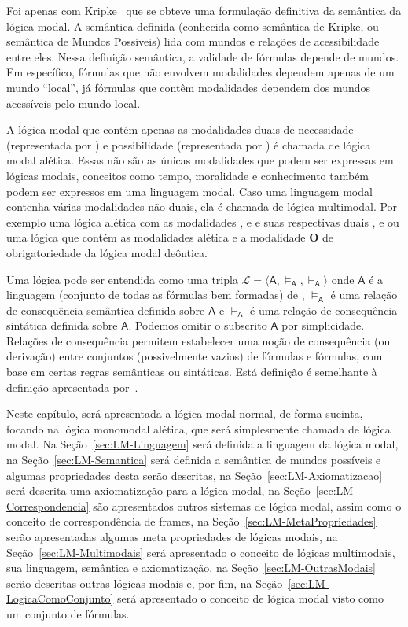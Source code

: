     Foi apenas com Kripke~\cite{kripke1959completeness,kripke1963semantical} que se obteve uma formulação definitiva da semântica da lógica modal.
    A semântica definida (conhecida como semântica de Kripke, ou semântica de Mundos Possíveis) lida com mundos e relações de acessibilidade entre eles.
    Nessa definição semântica, a validade de fórmulas depende de mundos. Em específico, fórmulas que não envolvem modalidades dependem apenas de um
    mundo ``local'', já fórmulas que contêm modalidades dependem dos mundos acessíveis pelo mundo local.

    A lógica modal que contém apenas as modalidades duais de necessidade (representada por \BOX) e possibilidade (representada por \DIA)
    é chamada de lógica modal alética. Essas não são as únicas modalidades que podem ser expressas em lógicas modais, conceitos como tempo,
    moralidade e conhecimento também podem ser expressos em uma linguagem modal.
    Caso uma linguagem modal contenha várias modalidades não duais, ela é chamada de lógica multimodal. Por exemplo uma lógica alética
    com as modalidades ,  e  e suas respectivas duais ,  e  ou uma lógica que contém as
    modalidades \DIA alética e a modalidade \(\mathbf{O}\) de obrigatoriedade da lógica modal deôntica.

    Uma lógica pode ser entendida como uma tripla \(\mathcal{L} = \langle \mathsf{A}, \vDash_{\mathsf{A}}, \vdash_{\mathsf{A}} \rangle\)
    onde \(\mathsf{A}\) é a linguagem (conjunto de todas as fórmulas bem formadas) de , \(\vDash_{\mathsf{A}}\) é uma relação de consequência
    semântica definida sobre \(\mathsf{A}\) e \(\vdash_{\mathsf{A}}\) é uma relação de consequência sintática definida sobre \(\mathsf{A}\).
    Podemos omitir o subscrito \(\mathsf{A}\) por simplicidade. Relações de consequência permitem estabelecer uma noção de consequência (ou derivação) entre conjuntos
    (possivelmente vazios) de fórmulas e fórmulas, com base em certas regras semânticas ou sintáticas. Está definição é semelhante à definição apresentada
    por~.

    Neste capítulo, será apresentada a lógica modal normal, de forma sucinta, focando na lógica monomodal alética, que será simplesmente chamada de lógica modal.
    Na Seção~\ref{sec:LM-Linguagem} será definida a linguagem da lógica modal, na Seção~\ref{sec:LM-Semantica} será definida a semântica de mundos possíveis e
    algumas propriedades desta serão descritas, na Seção~\ref{sec:LM-Axiomatizacao} será descrita uma axiomatização para a lógica modal, na
    Seção~\ref{sec:LM-Correspondencia} são apresentados outros sistemas de lógica modal, assim como o conceito de correspondência de frames, na
    Seção~\ref{sec:LM-MetaPropriedades} serão apresentadas algumas meta propriedades de lógicas modais, na Seção~\ref{sec:LM-Multimodais} será apresentado o conceito
    de lógicas multimodais, sua linguagem, semântica e axiomatização, na Seção~\ref{sec:LM-OutrasModais} serão descritas outras lógicas modais e, por fim, na
    Seção~\ref{sec:LM-LogicaComoConjunto} será apresentado o conceito de lógica modal visto como um conjunto de fórmulas.

